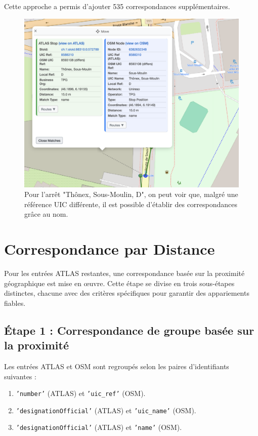 Cette approche a permis d'ajouter 535 correspondances supplémentaires.
\begin{figure}[h]
    \centering
    \includegraphics[width=\textwidth]{../figures/correspondances/matched_name.png}
    \caption[Exemple de correspondance par nom]{Pour l'arrêt "Thônex, Sous-Moulin, D", on peut voir que, malgré une référence UIC différente, il est possible d'établir des correspondances grâce au nom.}
    \label{fig:name_matching_example}
\end{figure}


\section{Correspondance par Distance}

Pour les entrées ATLAS restantes, une correspondance basée sur la proximité géographique est mise en œuvre. Cette étape se divise en trois sous-étapes distinctes, chacune avec des critères spécifiques pour garantir des appariements fiables.

\subsection{Étape 1 : Correspondance de groupe basée sur la proximité}
Les entrées ATLAS et OSM sont regroupés selon les paires d’identifiants suivantes :
\begin{enumerate}
    \item \texttt{'number'} (ATLAS) et \texttt{'uic\_ref'} (OSM).
    \item \texttt{'designationOfficial'} (ATLAS) et \texttt{'uic\_name'} (OSM).
    \item \texttt{'designationOfficial'} (ATLAS) et \texttt{'name'} (OSM).
\end{enumerate}

